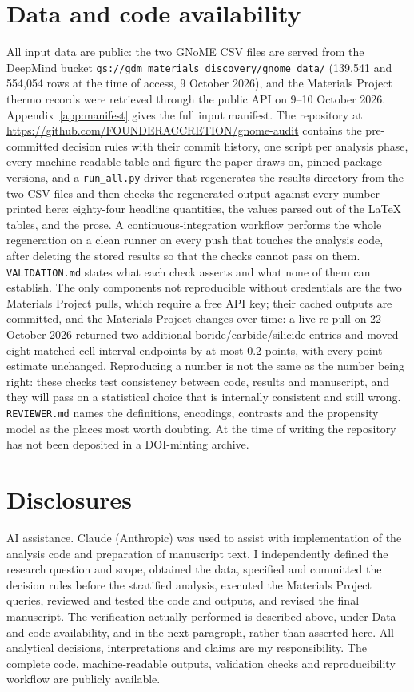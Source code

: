 \documentclass[11pt]{article}
\begin{document}
\section*{Data and code availability}

All input data are public: the two GNoME CSV files are served from the DeepMind bucket
\texttt{gs://gdm\_materials\_discovery/gnome\_data/} (139{,}541 and 554{,}054 rows at the
time of access, 9 October 2026), and the Materials Project thermo records were retrieved
through the public API on 9--10 October 2026. Appendix~\ref{app:manifest} gives the full
input manifest. The repository at \url{https://github.com/FOUNDERACCRETION/gnome-audit}
contains the pre-committed decision rules with their commit history, one script per
analysis phase, every machine-readable table and figure the paper draws on, pinned
package versions, and a \texttt{run\_all.py} driver that regenerates the results
directory from the two CSV files and then checks the regenerated output against every
number printed here: eighty-four headline quantities, the values parsed out of the
\LaTeX{} tables, and the prose. A continuous-integration workflow performs the whole
regeneration on a clean runner on every push that touches the analysis code, after
deleting the stored results so that the checks cannot pass on them.
\texttt{VALIDATION.md} states what each check asserts and what none of them can
establish. The only components not reproducible without credentials are the two
Materials Project pulls, which require a free API key; their cached outputs are
committed, and the Materials Project changes over time: a live re-pull on 22 October
2026 returned two additional boride/carbide/silicide entries and moved eight matched-cell
interval endpoints by at most 0.2 points, with every point estimate unchanged. Reproducing a number is not the same as the number being right: these checks
test consistency between code, results and manuscript, and they will pass on a
statistical choice that is internally consistent and still wrong. \texttt{REVIEWER.md}
names the definitions, encodings, contrasts and the propensity model as the places most
worth doubting. At the time of writing the repository has not been deposited in a DOI-minting
archive.

\section*{Disclosures}

AI assistance. Claude (Anthropic) was used to assist with implementation of the analysis
code and preparation of manuscript text. I independently defined the research question and
scope, obtained the data, specified and committed the decision rules before the stratified
analysis, executed the Materials Project queries, reviewed and tested the code and outputs,
and revised the final manuscript. The verification actually performed is described above, under
Data and code availability, and in the next paragraph, rather than asserted here. All
analytical decisions, interpretations and claims are my responsibility. The complete code,
machine-readable outputs, validation checks and reproducibility workflow are publicly
available.
\end{document}
